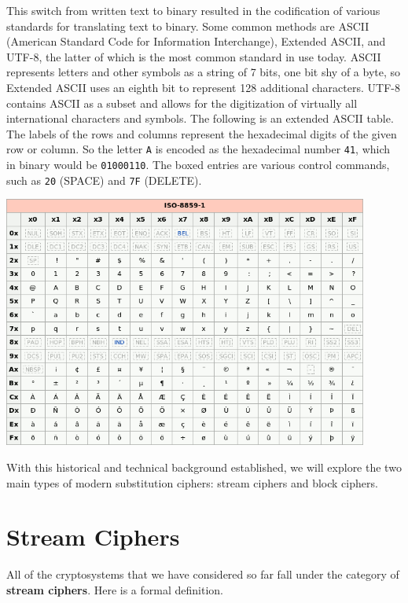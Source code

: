 This switch from written text to binary resulted in the codification of various standards for translating text to binary. Some common methods are ASCII  (American Standard Code for Information Interchange), Extended ASCII,  and UTF-8,  the latter of which is the most common standard in use today. ASCII represents letters and other symbols as a string of 7 bits, one bit shy of a byte, so Extended ASCII uses an eighth bit to represent 128 additional characters. UTF-8 contains ASCII as a subset and allows for the digitization of virtually all international characters and symbols. The following is an extended ASCII table. The labels of the rows and columns represent the hexadecimal digits of the given row or column. So the letter {\tt A} is encoded as the hexadecimal number {\tt 41}, which in binary would be {\tt 01000110}. The boxed entries are various control commands, such as {\tt 20} (SPACE) and {\tt 7F} (DELETE).


\begin{center}
\includegraphics[width=0.9\textwidth]{img/ext-ascii.png}
\end{center}

With this historical and technical background established, we will explore the two main types of modern substitution ciphers: stream ciphers and block ciphers.

	\section{Stream Ciphers}

All of the cryptosystems that we have considered so far fall under the category of {\bf stream ciphers}.   Here is a formal definition.

